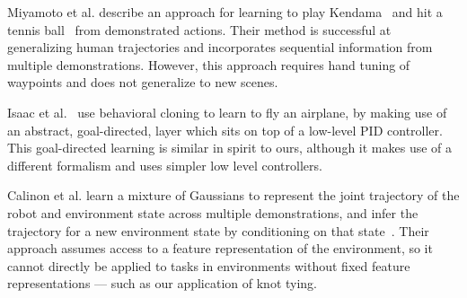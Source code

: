 Miyamoto et al. describe an approach for learning to play Kendama~\cite{Miyamoto_1996} and hit a 
tennis ball~\cite{Miyamoto_1998} from demonstrated actions. 
Their method is successful at generalizing human trajectories and incorporates sequential information 
from multiple demonstrations.
However, this approach requires hand tuning of waypoints and does not generalize to new scenes.

Isaac et al.~\cite{Isaac_ICML2003} use behavioral cloning to learn to fly an airplane, by making use of an abstract, 
goal-directed, layer which sits on top of a low-level PID controller.
This goal-directed learning is similar in spirit to ours, although it makes use of a different formalism
and uses simpler low level controllers.

Calinon et al. learn a mixture of Gaussians to represent the joint trajectory of the robot and environment
state across multiple demonstrations, and infer the trajectory for a new
environment state by conditioning on that state~\cite{Calinon_SMC2007, Calinon_HUM2009}. Their approach
assumes access to a feature representation of the environment, so it cannot directly be applied to tasks in
environments without fixed feature representations --- such as our application of knot tying.
